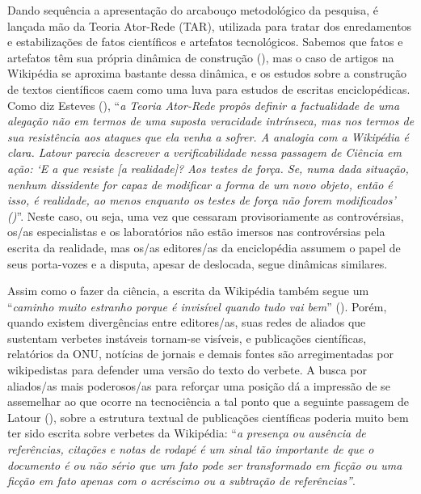 Dando sequência a apresentação do arcabouço metodológico da pesquisa, é lançada mão da Teoria Ator-Rede (TAR), utilizada para tratar dos enredamentos e estabilizações de fatos científicos e artefatos tecnológicos. Sabemos que fatos e artefatos têm sua própria dinâmica de construção (\cite{fleck_genesis_2010}), mas o caso de artigos na Wikipédia se aproxima bastante dessa dinâmica, e os estudos sobre a construção de textos científicos caem como uma luva para estudos de escritas enciclopédicas. Como diz Esteves (\citeyear[p.102]{esteves_as_2014}), “\textit{a Teoria Ator-Rede propôs definir a factualidade de uma alegação não em termos de uma suposta veracidade intrínseca, mas nos termos de sua resistência aos ataques que ela venha a sofrer. A analogia com a Wikipédia é clara. Latour parecia descrever a verificabilidade nessa passagem de Ciência em ação: ‘E a que resiste [a realidade]? Aos testes de força. Se, numa dada situação, nenhum dissidente for capaz de modificar a forma de um novo objeto, então é isso, é realidade, ao menos enquanto os testes de força não forem modificados’ (\citep[p.93]{latour_ciencia_1987})}”. Neste caso, ou seja, uma vez que cessaram provisoriamente as controvérsias, os/as especialistas e os laboratórios não estão imersos nas controvérsias pela escrita da realidade, mas os/as editores/as da enciclopédia assumem o papel de seus porta-vozes e a disputa, apesar de deslocada, segue dinâmicas similares.

Assim como o fazer da ciência, a escrita da Wikipédia também segue um “\textit{caminho muito estranho porque é invisível quando tudo vai bem}” (\citep[p.44]{latour_cogitamus_2010}). Porém, quando existem divergências entre editores/as, suas redes de aliados que sustentam verbetes instáveis tornam-se visíveis, e publicações científicas, relatórios da ONU, notícias de jornais e demais fontes são arregimentadas por wikipedistas para defender uma versão do texto do verbete. A busca por aliados/as mais poderosos/as para reforçar uma posição dá a impressão de se assemelhar ao que ocorre na tecnociência a tal ponto que a seguinte passagem de Latour (\citeyear[p.48]{latour_cogitamus_2010}), sobre a estrutura textual de publicações científicas poderia muito bem ter sido escrita sobre verbetes da Wikipédia: “\textit{a presença ou ausência de referências, citações e notas de rodapé é um sinal tão importante de que o documento é ou não sério que um fato pode ser transformado em ficção ou uma ficção em fato apenas com o acréscimo ou a subtração de referências”}.

